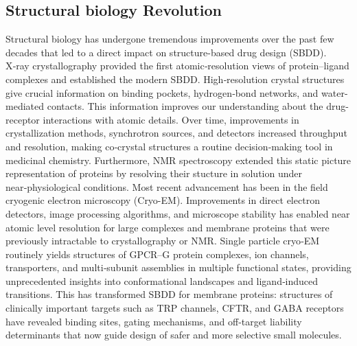 \subsection{Structural biology Revolution}
Structural biology has undergone tremendous improvements over the past few decades that led to a direct impact on structure-based drug design (SBDD)\cite{CH1_4}.  X‑ray crystallography provided the first atomic‑resolution views of protein–ligand complexes and established the modern SBDD. High‑resolution crystal structures give crucial information on binding pockets, hydrogen‑bond networks, and water-mediated contacts. This information improves our understanding about the drug-receptor interactions with atomic details. Over time, improvements in crystallization methods, synchrotron sources, and detectors increased throughput and resolution, making co‑crystal structures a routine decision‑making tool in medicinal chemistry. Furthermore,  NMR spectroscopy extended this static picture representation of proteins by resolving their stucture in solution under near‑physiological conditions\cite{CH1_4}.  
Most recent advancement has been in the field cryogenic electron microscopy (Cryo-EM). Improvements in direct electron detectors, image processing algorithms, and microscope stability has enabled near atomic level resolution for large complexes and membrane proteins that were previously intractable to crystallography or NMR. Single particle cryo‑EM routinely yields structures of GPCR–G protein complexes, ion channels, transporters, and multi‑subunit assemblies in multiple functional states, providing unprecedented insights into conformational landscapes and ligand‑induced transitions. This has transformed SBDD for membrane proteins: structures of clinically important targets such as TRP channels, CFTR, and GABA receptors have revealed binding sites, gating mechanisms, and off‑target liability determinants that now guide design of safer and more selective small molecules\cite{CH1_5}.

